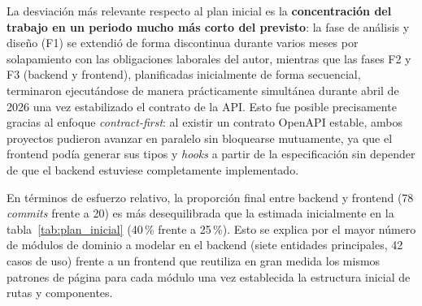 La desviación más relevante respecto al plan inicial es la \textbf{concentración
del trabajo en un periodo mucho más corto del previsto}: la fase de análisis y
diseño (F1) se extendió de forma discontinua durante varios meses por
solapamiento con las obligaciones laborales del autor, mientras que las
fases F2 y F3 (backend y frontend), planificadas inicialmente de forma
secuencial, terminaron ejecutándose de manera prácticamente simultánea durante
abril de 2026 una vez estabilizado el contrato de la API. Esto fue posible
precisamente gracias al enfoque \textit{contract-first}: al existir un contrato
OpenAPI estable, ambos proyectos pudieron avanzar en paralelo sin bloquearse
mutuamente, ya que el frontend podía generar sus tipos y \textit{hooks} a partir
de la especificación sin depender de que el backend estuviese completamente
implementado.

En términos de esfuerzo relativo, la proporción final entre backend y frontend
(78 \textit{commits} frente a 20) es más desequilibrada que la estimada
inicialmente en la tabla~\ref{tab:plan_inicial} (40\,\% frente a 25\,\%). Esto
se explica por el mayor número de módulos de dominio a modelar en el backend
(siete entidades principales, 42 casos de uso) frente a un frontend que reutiliza
en gran medida los mismos patrones de página para cada módulo una vez establecida
la estructura inicial de rutas y componentes.
